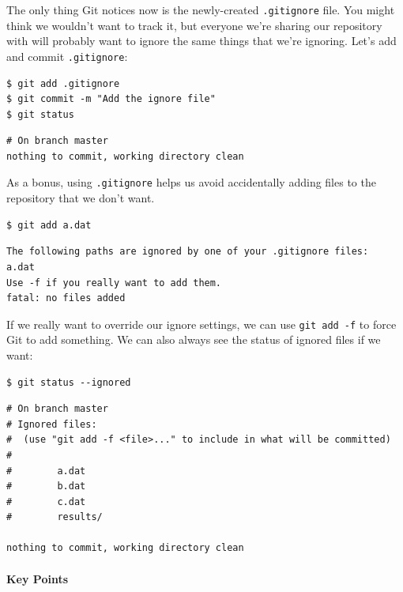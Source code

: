 \documentclass{book}
\begin{document}
The only thing Git notices now is the newly-created \texttt{.gitignore}
file. You might think we wouldn't want to track it, but everyone we're
sharing our repository with will probably want to ignore the same things
that we're ignoring. Let's add and commit \texttt{.gitignore}:

\begin{verbatim}
$ git add .gitignore
$ git commit -m "Add the ignore file"
$ git status
\end{verbatim}

\begin{verbatim}
# On branch master
nothing to commit, working directory clean
\end{verbatim}

As a bonus, using \texttt{.gitignore} helps us avoid accidentally adding
files to the repository that we don't want.

\begin{verbatim}
$ git add a.dat
\end{verbatim}

\begin{verbatim}
The following paths are ignored by one of your .gitignore files:
a.dat
Use -f if you really want to add them.
fatal: no files added
\end{verbatim}

If we really want to override our ignore settings, we can use
\texttt{git add -f} to force Git to add something. We can also always
see the status of ignored files if we want:

\begin{verbatim}
$ git status --ignored
\end{verbatim}

\begin{verbatim}
# On branch master
# Ignored files:
#  (use "git add -f <file>..." to include in what will be committed)
#
#        a.dat
#        b.dat
#        c.dat
#        results/

nothing to commit, working directory clean
\end{verbatim}

\mbox{}\paragraph{Key Points}
\end{document}
